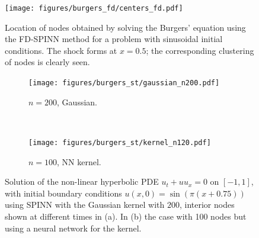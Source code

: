 \documentclass[12pt]{article}
\begin{document}
\begin{figure}
\centering
\texttt{[image: figures/burgers\_fd/centers\_fd.pdf]}
\caption{Location of nodes obtained by solving the Burgers' equation using the FD-SPINN method for a problem with sinusoidal initial conditions. The shock forms at $x=0.5$; the corresponding clustering of nodes is clearly seen.}
\label{fig:burgers_nodes}
\end{figure}

\begin{figure}
\centering
\begin{subfigure}{0.45\textwidth}
\texttt{[image: figures/burgers\_st/gaussian\_n200.pdf]}
\caption{$n = 200$, Gaussian.}
\label{fig:spinn_burgers_a}
\end{subfigure}
~
\begin{subfigure}{0.45\textwidth}
\texttt{[image: figures/burgers\_st/kernel\_n120.pdf]}
\caption{$n = 100$, NN kernel.}
\label{fig:spinn_burgers_c}
\end{subfigure}
\caption{Solution of the non-linear hyperbolic PDE $u_t + u u_x = 0$ on
  $[-1,1]$, with initial boundary conditions $u(x, 0) = \sin(\pi (x + 0.75))$ using SPINN with the Gaussian kernel with $200$, interior nodes shown at different times in (a). In (b) the case with 100 nodes but using a neural network for the kernel. }
\label{fig:spinn_burgers}
\end{figure}
\end{document}
